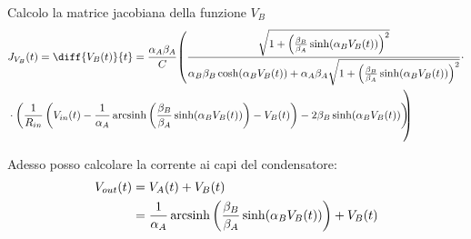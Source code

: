 		Calcolo la matrice jacobiana della funzione $V_{B}$
		\begin{equation}
			\label{eq:jacobiana}
			\begin{split}
				&J_{V_{B}}(t) = \diff{V_{B}(t)}{t} = \frac{\alpha_{A}\beta_{A}}{C}\reallybig(\frac{\sqrt{1+\left(\frac{\beta_{B}}{\beta_{A}}\sinh(\alpha_{B}V_{B}(t))\right)^{2}}}{\alpha_{B}\beta_{B}\cosh(\alpha_{B}V_{B}(t))+\alpha_{A}\beta_{A}\sqrt{1+\left(\frac{\beta_{B}}{\beta_{A}}\sinh(\alpha_{B}V_{B}(t))\right)^{2}}}\cdot\\&\cdot\left(\frac{1}{R_{in}}\left(V_{in}(t)-\frac{1}{\alpha_{A}} \arcsinh \left(\frac{\beta_{B}}{\beta_{A}} \sinh(\alpha_{B}V_{B}(t))\right)-V_{B}(t)\right)-2\beta_{B}\sinh(\alpha_{B}V_{B}(t))\right)\hspace{-7px}\reallybig)
			\end{split}
		\end{equation}
		
		Adesso posso calcolare la corrente ai capi del condensatore:
		\begin{equation}
			\label{eq:punto_fisso2}
			\begin{split}
				V_{out}(t) &= V_{A}(t)+V_{B}(t)\\
				&= \frac{1}{\alpha_{A}} \operatorname{arcsinh} \left(\frac{\beta_{B}}{\beta_{A}} \sinh(\alpha_{B}V_{B}(t))\right)+V_{B}(t)
			\end{split}
		\end{equation}